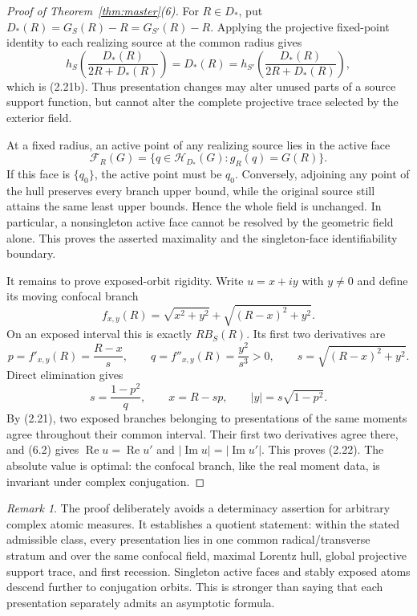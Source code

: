 \documentclass[11pt]{article}
\theoremstyle{remark}
\newtheorem{remark}[theorem]{Remark}
\newcommand{\Rea}{\operatorname{Re}}
\newcommand{\Ima}{\operatorname{Im}}
\begin{document}
\begin{proof}[Proof of Theorem~\ref{thm:master}(6)]
For $R\in D_*$, put $D_*(R)=G_S(R)-R=G_{S'}(R)-R$.  Applying the projective fixed-point identity
to each realizing source at the common radius gives
\[
 h_S\!\left(\frac{D_*(R)}{2R+D_*(R)}\right)=D_*(R)
 =h_{S'}\!\left(\frac{D_*(R)}{2R+D_*(R)}\right),
\]
which is (2.21b).  Thus presentation changes may alter unused parts of a source support function,
but cannot alter the complete projective trace selected by the exterior field.

At a fixed radius, an active point of any realizing source lies in the active face
\[
 \mathcal F_R(G)=\{q\in\mathcal H_{D_*}(G):g_R(q)=G(R)\}.
\]
If this face is $\{q_0\}$, the active point must be $q_0$.  Conversely, adjoining any point of the
hull preserves every branch upper bound, while the original source still attains the same least
upper bounds.  Hence the whole field is unchanged.  In particular, a nonsingleton active face
cannot be resolved by the geometric field alone.  This proves the asserted maximality and the
singleton-face identifiability boundary.

It remains to prove exposed-orbit rigidity.  Write $u=x+iy$ with $y\ne0$ and define its moving
confocal branch
\[
 f_{x,y}(R)=\sqrt{x^2+y^2}+\sqrt{(R-x)^2+y^2}.
\]
On an exposed interval this is exactly $RB_S(R)$.  Its first two derivatives are
\[
 p=f'_{x,y}(R)=\frac{R-x}{s},\qquad
 q=f''_{x,y}(R)=\frac{y^2}{s^3}>0,
 \qquad s=\sqrt{(R-x)^2+y^2}.
\]
Direct elimination gives
\begin{equation}
 s=\frac{1-p^2}{q},\qquad
 x=R-sp,\qquad
 |y|=s\sqrt{1-p^2}.
 \tag{6.2}
\end{equation}
By (2.21), two exposed branches belonging to presentations of the same moments agree throughout
their common interval.  Their first two derivatives agree there, and (6.2) gives
$\Rea u=\Rea u'$ and $|\Ima u|=|\Ima u'|$.  This proves (2.22).  The absolute value is optimal:
the confocal branch, like the real moment data, is invariant under complex conjugation.
\end{proof}

\begin{remark}
The proof deliberately avoids a determinacy assertion for arbitrary complex atomic measures.
It establishes a quotient statement: within the stated admissible class, every presentation lies
in one common radical/transverse stratum and over the same confocal field, maximal Lorentz hull,
global projective support trace, and first recession.  Singleton active faces and stably exposed
atoms descend further to conjugation orbits.  This is stronger than saying that each presentation
separately admits an asymptotic formula.
\end{remark}
\end{document}
